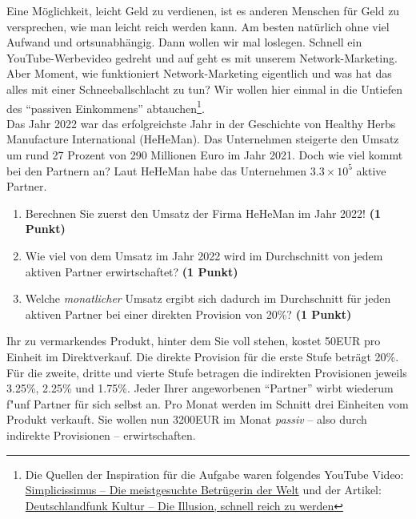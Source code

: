 \documentclass[a4paper, 9pt]{scrartcl}\usepackage[]{graphicx}\usepackage[]{xcolor}
\begin{document}
Eine M{\"o}glichkeit, leicht Geld zu verdienen, ist es anderen Menschen f{\"u}r Geld
zu versprechen, wie man leicht reich werden kann. Am besten nat{\"u}rlich ohne
viel Aufwand und ortsunabh{\"a}ngig. Dann wollen wir mal loslegen. Schnell
ein YouTube-Werbevideo gedreht und auf geht es mit unserem
Network-Marketing. Aber Moment, wie funktioniert Network-Marketing
eigentlich und was hat das alles mit einer Schneeballschlacht zu tun? Wir
wollen hier einmal in die Untiefen des "`passiven Einkommens"'
abtauchen\footnote{Die Quellen der Inspiration f{\"u}r die Aufgabe waren
  folgendes YouTube Video:
  \href{https://youtu.be/UOKkZF_qK9M?si=uf4foJVFKfeQMwSw}{Simplicissimus --
    Die meistgesuchte Betr{\"u}gerin der Welt} und der Artikel:
  \href{https://www.deutschlandfunkkultur.de/netzwerk-marketing-die-illusion-schnell-reich-zu-werden-100.html}{
    Deutschlandfunk Kultur -- Die Illusion, schnell reich zu werden}}.\\

Das Jahr 2022 war das erfolgreichste Jahr in der Geschichte von
Healthy Herbs Manufacture International (HeHeMan). Das Unternehmen steigerte den Umsatz um rund
27 Prozent von 290 Millionen Euro im Jahr
2021. Doch wie viel kommt bei den Partnern an? Laut
HeHeMan habe das Unternehmen \ensuremath{3.3\times 10^{5}} aktive Partner.

\begin{enumerate}
\item Berechnen Sie zuerst den Umsatz der Firma HeHeMan im
  Jahr 2022! \textbf{(1 Punkt)}
\item Wie viel von dem Umsatz im Jahr 2022 wird im Durchschnitt von jedem
  aktiven Partner erwirtschaftet? \textbf{(1 Punkt)}
\item Welche \textit{monatlicher} Umsatz ergibt sich dadurch im
  Durchschnitt f{\"u}r jeden aktiven Partner bei einer direkten Provision von
  20\%? \textbf{(1 Punkt)}
\end{enumerate}

Ihr zu vermarkendes Produkt, hinter dem Sie voll stehen, kostet
50EUR pro Einheit im Direktverkauf. Die direkte Provision
f{\"u}r die erste Stufe betr{\"a}gt 20\%. F{\"u}r die zweite, dritte und
vierte Stufe betragen die indirekten Provisionen jeweils 3.25\%,
2.25\% und 1.75\%. Jeder Ihrer angeworbenen "`Partner"'
wirbt wiederum f{"u}nf Partner f{\"u}r sich selbst an. Pro Monat
werden im Schnitt drei Einheiten vom Produkt verkauft. Sie wollen nun
3200EUR im Monat \textit{passiv} -- also durch indirekte
Provisionen -- erwirtschaften.
\end{document}
